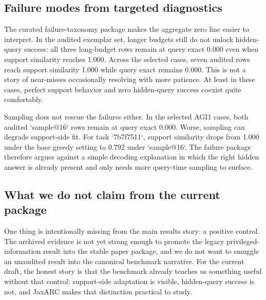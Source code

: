\subsection{Failure modes from targeted diagnostics}

The curated failure-taxonomy package makes the aggregate zero line easier to interpret. In the audited exemplar set, longer budgets still do not unlock hidden-query success: all three long-budget rows remain at query exact 0.000 even when support similarity reaches 1.000. Across the selected cases, seven audited rows reach support similarity 1.000 while query exact remains 0.000. This is not a story of near-misses occasionally resolving with more patience. At least in these cases, perfect support behavior and zero hidden-query success coexist quite comfortably.

Sampling does not rescue the failures either. In the selected AGI1 cases, both audited `sample@16` rows remain at query exact 0.000. Worse, sampling can degrade support-side fit. For task `7b7f7511`, support similarity drops from 1.000 under the base greedy setting to 0.792 under `sample@16`. The failure package therefore argues against a simple decoding explanation in which the right hidden answer is already present and only needs more query-time sampling to surface.

\subsection{What we do not claim from the current package}

One thing is intentionally missing from the main results story: a positive control. The archived evidence is not yet strong enough to promote the legacy privileged-information result into the stable paper package, and we do not want to smuggle an unaudited result into the canonical benchmark narrative. For the current draft, the honest story is that the benchmark already teaches us something useful without that control: support-side adaptation is visible, hidden-query success is not, and JaxARC makes that distinction practical to study.
